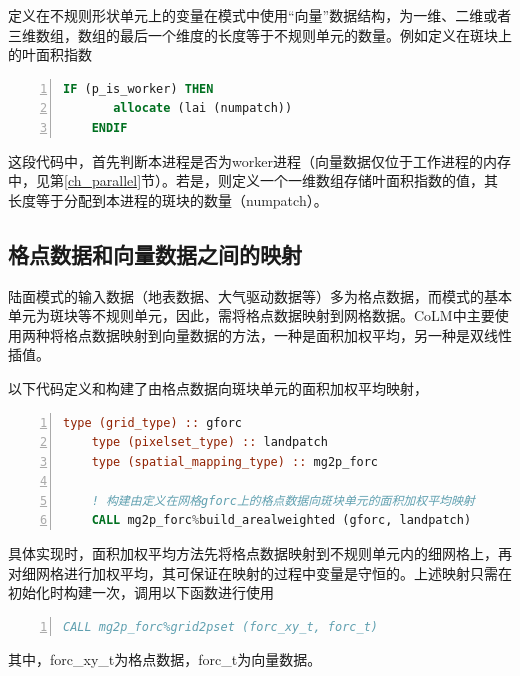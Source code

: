 定义在不规则形状单元上的变量在模式中使用“向量”数据结构，为一维、二维或者三维数组，数组的最后一个维度的长度等于不规则单元的数量。例如定义在斑块上的叶面积指数
\begin{lstlisting}[language=fortran, basicstyle=\linespread{1.0}\footnotesize\ttfamily, commentstyle=\color{olive}, numbers=left, numberstyle=\tiny, xleftmargin=1.5em,xrightmargin=0em, aboveskip=1em]
    IF (p_is_worker) THEN
       allocate (lai (numpatch))
    ENDIF
\end{lstlisting}
这段代码中，首先判断本进程是否为worker进程（向量数据仅位于工作进程的内存中，见第\ref{ch_parallel}节）。若是，则定义一个一维数组存储叶面积指数的值，其长度等于分配到本进程的斑块的数量（numpatch）。

\subsection{格点数据和向量数据之间的映射}

陆面模式的输入数据（地表数据、大气驱动数据等）多为格点数据，而模式的基本单元为斑块等不规则单元，因此，需将格点数据映射到网格数据。CoLM中主要使用两种将格点数据映射到向量数据的方法，一种是面积加权平均，另一种是双线性插值。

以下代码定义和构建了由格点数据向斑块单元的面积加权平均映射，
\begin{lstlisting}[language=fortran, basicstyle=\linespread{1.0}\footnotesize\ttfamily, commentstyle=\color{olive}, numbers=left, numberstyle=\tiny, xleftmargin=1.5em,xrightmargin=0em, aboveskip=1em]
    type (grid_type) :: gforc
    type (pixelset_type) :: landpatch
    type (spatial_mapping_type) :: mg2p_forc

    ! 构建由定义在网格gforc上的格点数据向斑块单元的面积加权平均映射
    CALL mg2p_forc%build_arealweighted (gforc, landpatch)
\end{lstlisting}
具体实现时，面积加权平均方法先将格点数据映射到不规则单元内的细网格上，再对细网格进行加权平均，其可保证在映射的过程中变量是守恒的。上述映射只需在初始化时构建一次，调用以下函数进行使用
\begin{lstlisting}[language=fortran, basicstyle=\linespread{1.0}\footnotesize\ttfamily, commentstyle=\color{olive}, numbers=left, numberstyle=\tiny, xleftmargin=1.5em,xrightmargin=0em, aboveskip=1em]
    CALL mg2p_forc%grid2pset (forc_xy_t, forc_t)
\end{lstlisting}
其中，forc\_xy\_t为格点数据，forc\_t为向量数据。

